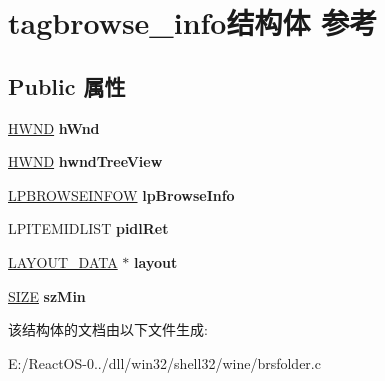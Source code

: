 \hypertarget{structtagbrowse__info}{}\section{tagbrowse\+\_\+info结构体 参考}
\label{structtagbrowse__info}
\subsection*{Public 属性}
\begin{DoxyCompactItemize}
\item 
\mbox{\label{structtagbrowse__info_a3dec1ecb00c06f613c5ce2f131ccea2c}} 
\hyperlink{interfacevoid}{H\+W\+ND} {\bfseries h\+Wnd}
\item 
\mbox{\label{structtagbrowse__info_a5064df2cc4e3bc3a914eb895ff4193ca}} 
\hyperlink{interfacevoid}{H\+W\+ND} {\bfseries hwnd\+Tree\+View}
\item 
\mbox{\label{structtagbrowse__info_a1dcb3606a05f8cc2052de922aba575a2}} 
\hyperlink{structtag_b_r_o_w_s_e_i_n_f_o_w}{L\+P\+B\+R\+O\+W\+S\+E\+I\+N\+F\+OW} {\bfseries lp\+Browse\+Info}
\item 
\mbox{\label{structtagbrowse__info_afd07dbb20ee79059cccddbf47fec640a}} 
L\+P\+I\+T\+E\+M\+I\+D\+L\+I\+ST {\bfseries pidl\+Ret}
\item 
\mbox{\label{structtagbrowse__info_ac992aa44fabdaa860a3b8b112e63848c}} 
\hyperlink{structtag_l_a_y_o_u_t___d_a_t_a}{L\+A\+Y\+O\+U\+T\+\_\+\+D\+A\+TA} $\ast$ {\bfseries layout}
\item 
\mbox{\label{structtagbrowse__info_a3b3bf1667719dba9b6c7ec420522a598}} 
\hyperlink{structtag_s_i_z_e}{S\+I\+ZE} {\bfseries sz\+Min}
\end{DoxyCompactItemize}


该结构体的文档由以下文件生成\+:\begin{DoxyCompactItemize}
\item 
E\+:/\+React\+O\+S-\/0../dll/win32/shell32/wine/brsfolder.\+c\end{DoxyCompactItemize}

